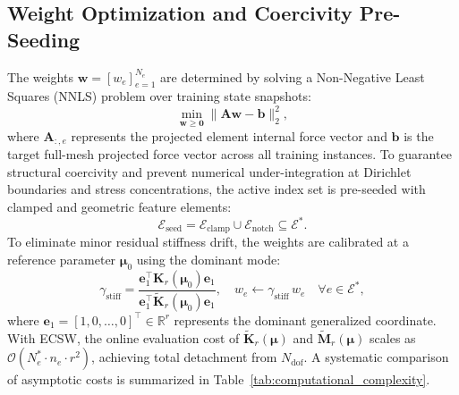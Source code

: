 \subsection{Weight Optimization and Coercivity Pre-Seeding}
\label{subsec:nnls_optimization}
The weights $\bm{w} = [w_e]_{e=1}^{N_e}$ are determined by solving a Non-Negative Least Squares (NNLS) problem \cite{lawson1974} over training state snapshots:
\begin{equation}
    \min_{\bm{w} \ge \bm{0}} \|\bm{A}\bm{w} - \bm{b}\|_2^2,
    \label{eq:nnls}
\end{equation}
where $\bm{A}_{:, e}$ represents the projected element internal force vector and $\bm{b}$ is the target full-mesh projected force vector across all training instances. To guarantee structural coercivity and prevent numerical under-integration at Dirichlet boundaries and stress concentrations, the active index set is pre-seeded with clamped and geometric feature elements:
\begin{equation}
    \mathcal{E}_{\text{seed}} = \mathcal{E}_{\text{clamp}} \cup \mathcal{E}_{\text{notch}} \subseteq \mathcal{E}^*.
\end{equation}
To eliminate minor residual stiffness drift, the weights are calibrated at a reference parameter $\bm{\mu}_0$ using the dominant mode:
\begin{equation}
    \gamma_{\text{stiff}} = \frac{\bm{e}_1^\top \bm{K}_r(\bm{\mu}_0) \bm{e}_1}{\bm{e}_1^\top \tilde{\bm{K}}_r(\bm{\mu}_0) \bm{e}_1}, \quad w_e \gets \gamma_{\text{stiff}} \, w_e \quad \forall e \in \mathcal{E}^*,
\end{equation}
where $\bm{e}_1 = [1, 0, \dots, 0]^\top \in \mathbb{R}^r$ represents the dominant generalized coordinate. With ECSW, the online evaluation cost of $\tilde{\bm{K}}_r(\bm{\mu})$ and $\tilde{\bm{M}}_r(\bm{\mu})$ scales as $\mathcal{O}(N_e^* \cdot n_e \cdot r^2)$, achieving total detachment from $N_{\text{dof}}$. A systematic comparison of asymptotic costs is summarized in Table~\ref{tab:computational_complexity}.

\begin{table}[htbp]
\centering
\caption{Asymptotic computational complexity comparison across FOM, standard Galerkin pROM, and ECSW hyper-reduced pROM per time step.}
\label{tab:computational_complexity}
\end{table}


